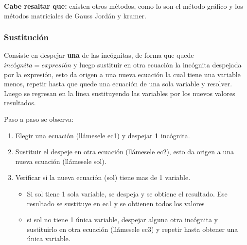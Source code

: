     \textbf{Cabe resaltar que:} existen otros métodos, como lo son el método
    gráfico y los métodos matriciales
    de Gauss Jordán y kramer.

    \subsubsection*{Sustitución} \label{Sustitucion}

    Consiste en despejar \textbf{una} de las incógnitas, de forma que quede
    $incógnita=expresión$ y luego sustituir en otra ecuación la incógnita
    despejada por la expresión, esto da origen a una
    nueva ecuación la cual tiene una variable menos, repetir hasta que quede
    una ecuación de una sola variable y resolver. Luego se regresan en la linea
    sustituyendo las variables por los nuevos valores resultados.

    Paso a paso se observa:

    \begin{enumerate}
        \item Elegir una ecuación (llámesele ec1) y despejar \textbf{1} incógnita.
        \item Sustituir el despeje en otra ecuación (llámesele ec2), esto
            da origen a una nueva ecuación (llámesele sol).
        \item Verificar si la nueva ecuación (sol) tiene mas de 1 variable.
            \begin{itemize}
                \item Si sol tiene 1 sola variable, se despeja y se obtiene el
                    resultado. Ese resultado se sustituye en ec1 y se obtienen
                    todos los valores
                \item si sol no tiene 1 única variable, despejar alguna otra incógnita
                    y sustituirlo en otra ecuación (llámesele ec3) y repetir hasta
                    obtener una única variable.
            \end{itemize}
    \end{enumerate}

























